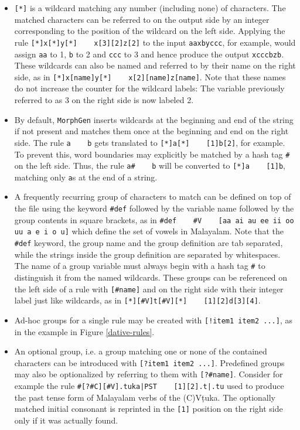 \documentclass[a4paper]{article}
\newcommand{\tab}{~~~}
\newcommand{\typ}[1]{\texttt{#1}}
\begin{document}
\begin{itemize}
\item{} \typ{[*]} is a wildcard matching any number (including none) of characters. The matched characters can be referred to on the output side by an integer corresponding to the position of the wildcard on the left side. Applying the rule \typ{[*]x[*]y[*] \tab x[3][2]z[2]} to the input \typ{aaxbyccc}, for example, would assign \typ{aa} to 1, \typ{b} to 2 and \typ{ccc} to 3 and hence produce the output \typ{xcccbzb}. These wildcards can also be named and referred to by their name on the right side, as in \typ{[*]x[name]y[*] \tab x[2][name]z[name]}. Note that these names do not increase the counter for the wildcard labels: The variable previously referred to as 3 on the right side is now labeled 2.
\item By default, \typ{MorphGen} inserts wildcards at the beginning and end of the string if not present and matches them once at the beginning and end on the right side. The rule \typ{a \tab b} gets translated to \typ{[*]a[*] \tab [1]b[2]}, for example. To prevent this, word boundaries may explicitly be matched by a hash tag \typ{\#} on the left side. Thus, the rule \typ{a\# \tab b} will be converted to \typ{[*]a \tab [1]b}, matching only \typ{a}s at the end of a string.
\item A frequently recurring group of characters to match can be defined on top of the file using the keyword \typ{\#def} followed by the variable name followed by the group contents in square brackets, as in \typ{\#def \tab \#V \tab [aa ai au ee ii oo uu a e i o u]} which define the set of vowels in Malayalam. Note that the \typ{\#def} keyword, the group name and the group definition are tab separated, while the strings inside the group definition are separated by whitespaces. The name of a group variable must always begin with a hash tag \typ{\#} to distinguish it from the named wildcards. These groups can be referenced on the left side of a rule with \typ{[\#name]} and on the right side with their integer label just like wildcards, as in \typ{[*][\#V]t[\#V][*] \tab [1][2]d[3][4]}.
\item Ad-hoc groups for a single rule may be created with \typ{[!item1 item2 ...]}, as in the example in Figure \ref{dative-rules}.
\item An optional group, i.e. a group matching one or none of the contained characters can be introduced with \typ{[?item1 item2 ...]}. Predefined groups may also be optionalized by referring to them with \typ{[?\#name]}. Consider for example the rule \typ{\#[?\#C][\#V].tuka|PST \tab [1][2].t|.tu} used to produce the past tense form of Malayalam verbs of the (C)Vṭuka. The optionally matched initial consonant is reprinted in the \typ{[1]} position on the right side only if it was actually found.

\end{itemize}
\end{document}
